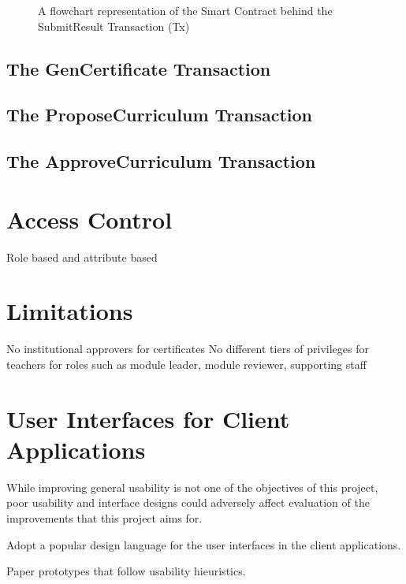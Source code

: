 \begin{figure}[!ht]
    \centering
    \caption{A flowchart representation of the Smart Contract behind the SubmitResult Transaction (Tx)} \label{fig:srtx}
\end{figure}

\subsection{The GenCertificate Transaction}

\subsection{The ProposeCurriculum Transaction}

\subsection{The ApproveCurriculum Transaction}


\section{Access Control}
Role based and attribute based

\section{Limitations}
No institutional approvers for certificates
No different tiers of privileges for teachers for roles such as module leader, module reviewer, supporting staff

\section{User Interfaces for Client Applications}

While improving general usability is not one of the objectives of this project, poor usability and interface designs 
could adversely affect evaluation of the improvements that this project aims for.

Adopt a popular design language for the user interfaces in the client applications.

Paper prototypes that follow usability hieuristics.